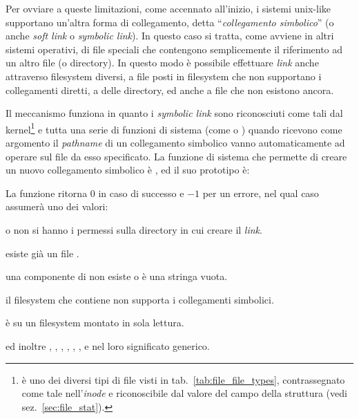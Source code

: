 Per ovviare a queste limitazioni, come accennato all'inizio, i sistemi
unix-like supportano un'altra forma di collegamento, detta
``\textsl{collegamento simbolico}'' (o anche \textit{soft link} o
\textit{symbolic link}). In questo caso si tratta, come avviene in altri
sistemi operativi, di file speciali che contengono semplicemente il
riferimento ad un altro file (o directory). In questo modo è possibile
effettuare \textit{link} anche attraverso filesystem diversi, a file posti in
filesystem che non supportano i collegamenti diretti, a delle directory, ed
anche a file che non esistono ancora.


Il meccanismo funziona in quanto i \textit{symbolic link} sono riconosciuti
come tali dal kernel\footnote{è uno dei diversi tipi di file visti in
  tab.~\ref{tab:file_file_types}, contrassegnato come tale nell'\textit{inode}
  e riconoscibile dal valore del campo  della struttura
   (vedi sez.~\ref{sec:file_stat}).} e tutta una serie di
funzioni di sistema (come  o ) quando ricevono come
argomento il \textit{pathname} di un collegamento simbolico vanno
automaticamente ad operare sul file da esso specificato. La funzione di
sistema che permette di creare un nuovo collegamento simbolico è
, ed il suo prototipo è:

\begin{funcproto}{
}
{La funzione ritorna $0$ in caso di successo e $-1$ per un errore,
  nel qual caso  assumerà uno dei valori: 
  \begin{errlist}
  \item[\errcode{EACCES}]  o non si hanno i permessi sulla directory in cui
    creare il \textit{link}.
  \item[\errcode{EEXIST}] esiste già un file .
  \item[\errcode{ENOENT}] una componente di  non esiste o
     è una stringa vuota.
  \item[\errcode{EPERM}] il filesystem che contiene  non
    supporta i collegamenti simbolici.
  \item[\errcode{EROFS}]  è su un filesystem montato in sola
    lettura.
  \end{errlist} ed inoltre , , ,
  , , ,  e
   nel loro significato generico.}
\end{funcproto}


